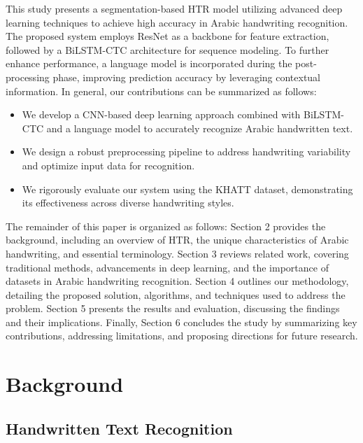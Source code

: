 \documentclass[conference]{IEEEtran}
\newcounter{customsubsubsection} %
\let\oldsubsection\subsection
\renewcommand{\subsection}[1]{%
  \oldsubsection{#1}%
  \setcounter{customsubsubsection}{0}%
}
\begin{document}
This study presents a segmentation-based HTR model utilizing advanced deep learning techniques to achieve high accuracy in Arabic handwriting recognition. The proposed system employs ResNet as a backbone for feature extraction, followed by a BiLSTM-CTC architecture for sequence modeling. To further enhance performance, a language model is incorporated during the post-processing phase, improving prediction accuracy by leveraging contextual information. In general, our contributions can be summarized as follows:


\begin{itemize}
    \item We develop a CNN-based deep learning approach combined with BiLSTM-CTC and a language model to accurately recognize Arabic handwritten text.
    \item We design a robust preprocessing pipeline to address handwriting variability and optimize input data for recognition.
    \item We rigorously evaluate our system using the KHATT dataset, demonstrating its effectiveness across diverse handwriting styles.
\end{itemize}

The remainder of this paper is organized as follows: Section 2 provides the background, including an overview of HTR, the unique characteristics of Arabic handwriting, and essential terminology. Section 3 reviews related work, covering traditional methods, advancements in deep learning, and the importance of datasets in Arabic handwriting recognition. Section 4 outlines our methodology, detailing the proposed solution, algorithms, and techniques used to address the problem. Section 5 presents the results and evaluation, discussing the findings and their implications. Finally, Section 6 concludes the study by summarizing key contributions, addressing limitations, and proposing directions for future research.


\section{Background}











\subsection{Handwritten Text Recognition}
\end{document}
